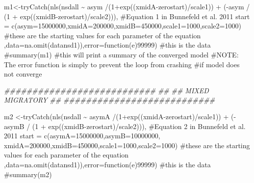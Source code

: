 \documentclass[
  letterpaper,
]{book}
\newenvironment{Shaded}{\begin{snugshade}}{\end{snugshade}}
\newcommand{\AttributeTok}[1]{\textcolor[rgb]{0.40,0.45,0.13}{#1}}
\newcommand{\CommentTok}[1]{\textcolor[rgb]{0.37,0.37,0.37}{#1}}
\newcommand{\ControlFlowTok}[1]{\textcolor[rgb]{0.00,0.23,0.31}{#1}}
\newcommand{\DecValTok}[1]{\textcolor[rgb]{0.68,0.00,0.00}{#1}}
\newcommand{\DocumentationTok}[1]{\textcolor[rgb]{0.37,0.37,0.37}{\textit{#1}}}
\newcommand{\FunctionTok}[1]{\textcolor[rgb]{0.28,0.35,0.67}{#1}}
\newcommand{\NormalTok}[1]{\textcolor[rgb]{0.00,0.23,0.31}{#1}}
\newcommand{\OtherTok}[1]{\textcolor[rgb]{0.00,0.23,0.31}{#1}}
\newcommand{\SpecialCharTok}[1]{\textcolor[rgb]{0.37,0.37,0.37}{#1}}
\begin{document}
\begin{Shaded}
\begin{Highlighting}[]
\NormalTok{m1}\OtherTok{\textless{}{-}}\FunctionTok{tryCatch}\NormalTok{(}\FunctionTok{nls}\NormalTok{(nsdall }\SpecialCharTok{\textasciitilde{}}\NormalTok{  asym }\SpecialCharTok{/}\NormalTok{(}\DecValTok{1}\SpecialCharTok{+}\FunctionTok{exp}\NormalTok{((xmidA}\SpecialCharTok{{-}}\NormalTok{zerostart)}\SpecialCharTok{/}\NormalTok{scale1)) }\SpecialCharTok{+} 
\NormalTok{(}\SpecialCharTok{{-}}\NormalTok{asym }\SpecialCharTok{/}\NormalTok{ (}\DecValTok{1} \SpecialCharTok{+} \FunctionTok{exp}\NormalTok{((xmidB}\SpecialCharTok{{-}}\NormalTok{zerostart)}\SpecialCharTok{/}\NormalTok{scale2))), }\CommentTok{\#Equation 1 in Bunnefeld et al. 2011}
\AttributeTok{start =} \FunctionTok{c}\NormalTok{(}\AttributeTok{asym=}\DecValTok{15000000}\NormalTok{,}\AttributeTok{xmidA=}\DecValTok{200000}\NormalTok{,}\AttributeTok{xmidB=}\DecValTok{450000}\NormalTok{,}\AttributeTok{scale1=}\DecValTok{1000}\NormalTok{,}\AttributeTok{scale2=}\DecValTok{1000}\NormalTok{)                  }
\CommentTok{\#these are the starting values for each parameter of the equation }
\NormalTok{,}\AttributeTok{data=}\FunctionTok{na.omit}\NormalTok{(datansd1)),}\AttributeTok{error=}\ControlFlowTok{function}\NormalTok{(e)}\DecValTok{99999}\NormalTok{)   }\CommentTok{\#this is the data}
\CommentTok{\#summary(m1)        \#this will print a summary of the converged model}
\CommentTok{\#NOTE: The error function is simply to prevent the loop from crashing }
\CommentTok{\#if model does not converge}

\DocumentationTok{\#\#\#\#\#\#\#\#\#\#\#\#\#\#\#\#\#\#\#\#\#\#\#\#\#\#\#}
\DocumentationTok{\#\#}
\DocumentationTok{\#\#  MIXED MIGRATORY}
\DocumentationTok{\#\#}
\DocumentationTok{\#\#\#\#\#\#\#\#\#\#\#\#\#\#\#\#\#\#\#\#\#\#\#\#\#\#\#}

\NormalTok{m2 }\OtherTok{\textless{}{-}}\FunctionTok{tryCatch}\NormalTok{(}\FunctionTok{nls}\NormalTok{(nsdall }\SpecialCharTok{\textasciitilde{}}\NormalTok{  asymA }\SpecialCharTok{/}\NormalTok{(}\DecValTok{1}\SpecialCharTok{+}\FunctionTok{exp}\NormalTok{((xmidA}\SpecialCharTok{{-}}\NormalTok{zerostart)}\SpecialCharTok{/}\NormalTok{scale1)) }\SpecialCharTok{+} 
\NormalTok{(}\SpecialCharTok{{-}}\NormalTok{asymB }\SpecialCharTok{/}\NormalTok{ (}\DecValTok{1} \SpecialCharTok{+} \FunctionTok{exp}\NormalTok{((xmidB}\SpecialCharTok{{-}}\NormalTok{zerostart)}\SpecialCharTok{/}\NormalTok{scale2))), }\CommentTok{\#Equation 2 in Bunnefeld et al. 2011}
\AttributeTok{start =} \FunctionTok{c}\NormalTok{(}\AttributeTok{asymA=}\DecValTok{15000000}\NormalTok{,}\AttributeTok{asymB=}\DecValTok{10000000}\NormalTok{, }\AttributeTok{xmidA=}\DecValTok{200000}\NormalTok{,}\AttributeTok{xmidB=}\DecValTok{450000}\NormalTok{,}\AttributeTok{scale1=}\DecValTok{1000}\NormalTok{,}\AttributeTok{scale2=}\DecValTok{1000}\NormalTok{)                  }
\CommentTok{\#these are the starting values for each parameter of the equation }
\NormalTok{,}\AttributeTok{data=}\FunctionTok{na.omit}\NormalTok{(datansd1)),}\AttributeTok{error=}\ControlFlowTok{function}\NormalTok{(e)}\DecValTok{99999}\NormalTok{)   }\CommentTok{\#this is the data }
\CommentTok{\#summary(m2)}


\end{Highlighting}
\end{Shaded}
\end{document}
